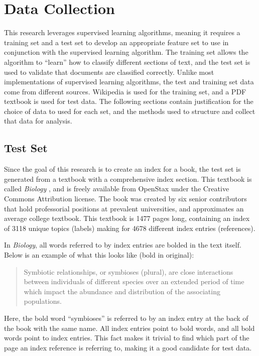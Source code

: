 \section{Data Collection}

This research leverages supervised learning algorithms, meaning it requires a training set and a test set to develop an appropriate feature set to use in conjunction with the supervised learning algorithm.
The training set allows the algorithm to ``learn'' how to classify different sections of text, and the test set is used to validate that documents are classified correctly.
Unlike most implementations of supervised learning algorithms, the test and training set data come from different sources.
Wikipedia is used for the training set, and a PDF textbook is used for test data.
The following sections contain justification for the choice of data to used for each set, and the methods used to structure and collect that data for analysis.

\subsection{Test Set}

Since the goal of this research is to create an index for a book, the test set is generated from a textbook with a comprehensive index section.
This textbook is called {\it Biology} \cite{biology}, and is freely available from OpenStax \cite{openstax-bio} under the Creative Commons Attribution license.
The book was created by six senior contributors that hold professorial positions at prevalent universities, and approximates an average college textbook.
This textbook is 1477 pages long, containing an index of 3118 unique topics (labels) making for 4678 different index entries (references).

In {\it Biology}, all words referred to by index entries are bolded in the text itself. Below is an example of what this looks like (bold in original):

\begin{quote}
Symbiotic relationships, or symbioses (plural), are close interactions between individuals of different species over an extended period of time which impact the abundance and distribution of the associating populations. \cite{biology}
\end{quote}

\noindent Here, the bold word ``symbioses'' is referred to by an index entry at the back of the book with the same name. All index entries point to bold words, and all bold words point to index entries. This fact makes it trivial to find which part of the page an index reference is referring to, making it a good candidate for test data.

